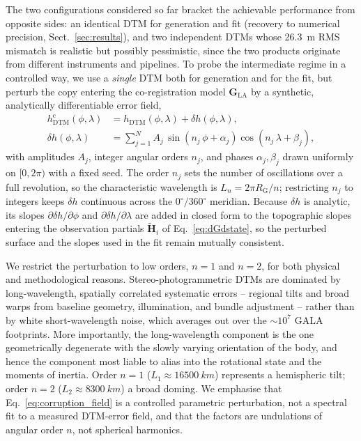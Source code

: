 \documentclass[lineno, pdflatex,sn-mathphys-ay]{sn-jnl}
\theoremstyle{thmstyleone}%
\theoremstyle{thmstyletwo}%
\theoremstyle{thmstylethree}%
\renewcommand{\vec}[1]{\boldsymbol{#1}}
\begin{document}
The two configurations considered so far bracket the achievable performance from opposite sides: an identical DTM for generation and fit (recovery to numerical precision, Sect.~\ref{sec:results}), and two independent DTMs whose \SI{26.3}{m} RMS mismatch is realistic but possibly pessimistic, since the two products originate from different instruments and pipelines. To probe the intermediate regime in a controlled way, we use a \emph{single} DTM both for generation and for the fit, but perturb the copy entering the co-registration model $\vec{G}_{\mathrm{LA}}$ by a synthetic, analytically differentiable error field,
%
\begin{align}
	h_{\mathrm{DTM}}^{\mathrm{c}}(\phi, \lambda) &= h_{\mathrm{DTM}}(\phi, \lambda) + \delta h(\phi, \lambda), 
	\\%
	\delta h(\phi, \lambda) &= \sum_{j=1}^{N} A_j \, \sin\!\left( n_j\, \phi + \alpha_j \right)\cos\!\left( n_j\, \lambda + \beta_j \right),
	\label{eq:corruption_field}
\end{align}
%
with amplitudes $A_j$, integer angular orders $n_j$, and phases $\alpha_j, \beta_j$ drawn uniformly on $[0, 2\pi)$ with a fixed seed. The order $n_j$ sets the number of oscillations over a full revolution, so the characteristic wavelength is $L_{n}=2\pi R_{\mathrm{G}}/n$; restricting $n_j$ to integers keeps $\delta h$ continuous across the $0^\circ/360^\circ$ meridian. Because $\delta h$ is analytic, its slopes $\partial\delta h/\partial\phi$ and $\partial\delta h/\partial\lambda$ are added in closed form to the topographic slopes entering the observation partials $\tilde{\vec H}_i$ of Eq.~\eqref{eq:dGdstate}, so the perturbed surface and the slopes used in the fit remain mutually consistent.

We restrict the perturbation to low orders, $n=1$ and $n=2$, for both physical and methodological reasons. Stereo-photogrammetric DTMs are dominated by long-wavelength, spatially correlated systematic errors -- regional tilts and broad warps from baseline geometry, illumination, and bundle adjustment -- rather than by white short-wavelength noise, which averages out over the $\sim\!10^{7}$ GALA footprints. More importantly, the long-wavelength component is the one geometrically degenerate with the slowly varying orientation of the body, and hence the component most liable to alias into the rotational state and the moments of inertia. Order $n=1$ ($L_1 \approx \SI{16500}{km}$) represents a hemispheric tilt; order $n=2$ ($L_2 \approx \SI{8300}{km}$) a broad doming. We emphasise that Eq.~\eqref{eq:corruption_field} is a controlled parametric perturbation, not a spectral fit to a measured DTM-error field, and that the factors are undulations of angular order $n$, not spherical harmonics.
\end{document}
